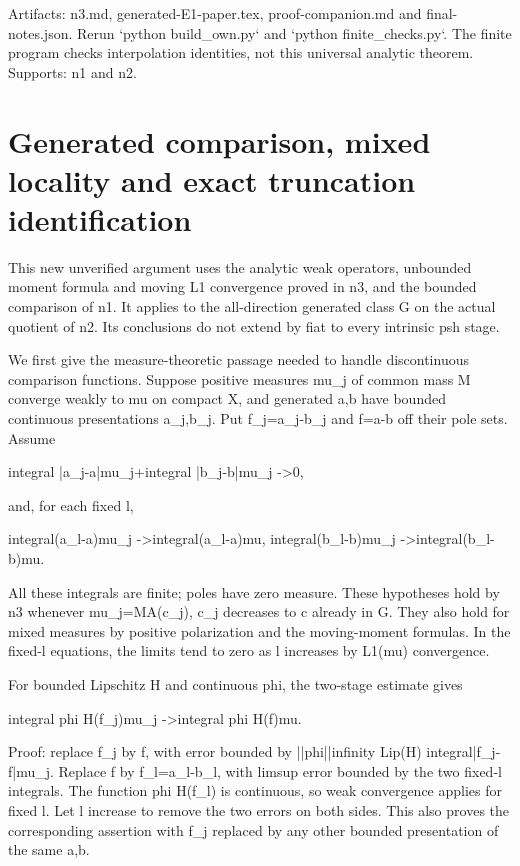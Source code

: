 \documentclass[11pt]{article}
\begin{document}
Artifacts: n3.md, generated-E1-paper.tex, proof-companion.md and final-notes.json. Rerun `python build\_own.py` and `python finite\_checks.py`. The finite program checks interpolation identities, not this universal analytic theorem. Supports: n1 and n2.


\section*{Generated comparison, mixed locality and exact truncation identification}

This new unverified argument uses the analytic weak operators, unbounded moment formula and moving L1 convergence proved in n3, and the bounded comparison of n1. It applies to the all-direction generated class G on the actual quotient of n2. Its conclusions do not extend by fiat to every intrinsic psh stage.

We first give the measure-theoretic passage needed to handle discontinuous comparison functions. Suppose positive measures mu\_j of common mass M converge weakly to mu on compact X, and generated a,b have bounded continuous presentations a\_j,b\_j. Put f\_j=a\_j-b\_j and f=a-b off their pole sets. Assume

integral |a\_j-a|mu\_j+integral |b\_j-b|mu\_j ->0,

and, for each fixed l,

integral(a\_l-a)mu\_j ->integral(a\_l-a)mu,
integral(b\_l-b)mu\_j ->integral(b\_l-b)mu.

All these integrals are finite; poles have zero measure. These hypotheses hold by n3 whenever mu\_j=MA(c\_j), c\_j decreases to c already in G. They also hold for mixed measures by positive polarization and the moving-moment formulas. In the fixed-l equations, the limits tend to zero as l increases by L1(mu) convergence.

For bounded Lipschitz H and continuous phi, the two-stage estimate gives

integral phi H(f\_j)mu\_j ->integral phi H(f)mu.

Proof: replace f\_j by f, with error bounded by ||phi||infinity Lip(H) integral|f\_j-f|mu\_j. Replace f by f\_l=a\_l-b\_l, with limsup error bounded by the two fixed-l integrals. The function phi H(f\_l) is continuous, so weak convergence applies for fixed l. Let l increase to remove the two errors on both sides. This also proves the corresponding assertion with f\_j replaced by any other bounded presentation of the same a,b.
\end{document}
